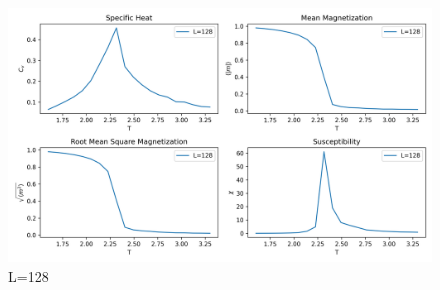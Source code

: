 \documentclass[11pt]{article}
\begin{document}
\begin{question}
  \begin{figure}[H]
    \centering
    \includegraphics[width=0.7\columnwidth]{ising_model_L128.png}
    \caption{L=128}
  \end{figure}
\end{question}

\end{document}
